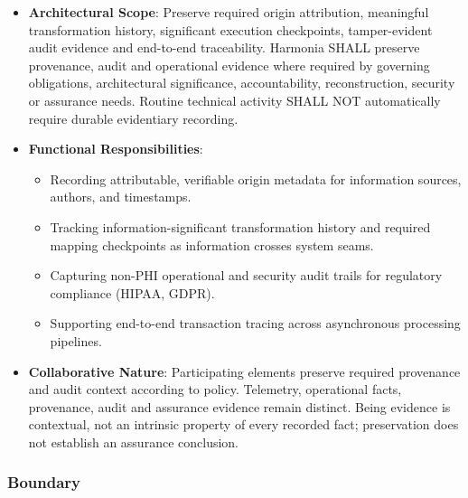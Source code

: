 \begin{itemize}

\item
\textbf{Architectural Scope}: Preserve required origin attribution, meaningful transformation history, significant execution checkpoints, tamper-evident audit evidence and end-to-end traceability. Harmonia SHALL preserve provenance, audit and operational evidence where required by governing obligations, architectural significance, accountability, reconstruction, security or assurance needs. Routine technical activity SHALL NOT automatically require durable evidentiary recording.



\item
\textbf{Functional Responsibilities}:


\begin{itemize}

\item
Recording attributable, verifiable origin metadata for information sources, authors, and timestamps.



\item
Tracking information-significant transformation history and required mapping checkpoints as information crosses system seams.



\item
Capturing non-PHI operational and security audit trails for regulatory compliance (HIPAA, GDPR).



\item
Supporting end-to-end transaction tracing across asynchronous processing pipelines.



\end{itemize}


\item
\textbf{Collaborative Nature}: Participating elements preserve required provenance and audit context according to policy. Telemetry, operational facts, provenance, audit and assurance evidence remain distinct. Being evidence is contextual, not an intrinsic property of every recorded fact; preservation does not establish an assurance conclusion.



\end{itemize}
\subsubsection*{Boundary}


